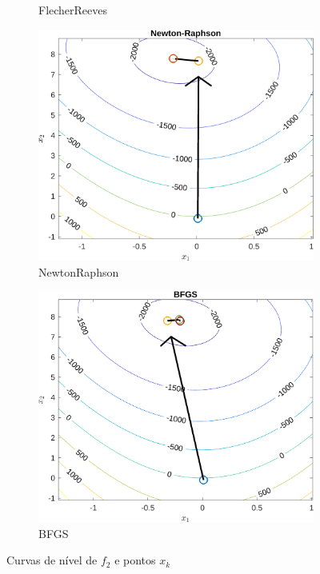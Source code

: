 \documentclass[10pt, a4paper]{article}
\begin{document}
\begin{figure}[H]
\begin{subfigure}{0.45\textwidth}
            \caption{Flecher\-Reeves}
            \label{fig:graf02_m04}
      \end{subfigure}
      \begin{subfigure}{0.45\textwidth}
            \centering
            \includegraphics[width=\textwidth]{img02_m05.png}
            \caption{Newton\-Raphson}
            \label{fig:graf02_m05}
      \end{subfigure}
      \begin{subfigure}{0.45\textwidth}
            \centering
            \includegraphics[width=\textwidth]{img02_m06.png}
            \caption{BFGS}
            \label{fig:graf02_m06}
      \end{subfigure}
      \caption{Curvas de n\'ivel de $f_{2}$ e pontos $x_{k}$}
      \label{fig:graf02}
\end{figure}
\end{document}
